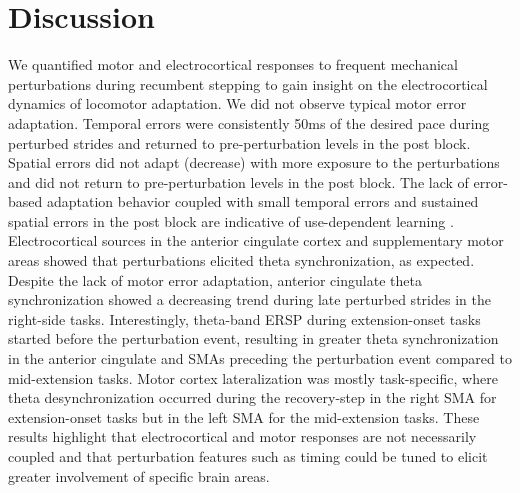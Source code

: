 \documentclass[../thesis_seyed.tex]{subfiles}
\begin{document}
\section{Discussion}
\label{sec:Discussion}

We quantified motor and electrocortical responses to frequent mechanical perturbations during recumbent stepping to gain insight on the electrocortical dynamics of locomotor adaptation. We did not observe typical motor error adaptation. Temporal errors {were consistently} \td50ms of the desired pace during perturbed strides and returned to pre-perturbation levels in the post block. Spatial errors did not adapt (decrease) with more exposure to the perturbations and did not return to pre-perturbation levels in the post block. The lack of error-based adaptation behavior coupled with small temporal errors and sustained spatial errors in the post block are indicative of use-dependent learning \cite{Diedrichsen2010-as}. Electrocortical sources in the anterior cingulate cortex and supplementary motor areas showed that perturbations elicited theta synchronization, as expected. {Despite the lack of motor error adaptation, anterior cingulate theta synchronization showed a decreasing trend during late perturbed strides in the right-side tasks.} Interestingly, theta-band ERSP during extension-onset tasks started before the perturbation event, resulting in greater theta synchronization in the anterior cingulate and SMAs preceding the perturbation event compared to mid-extension tasks. Motor cortex lateralization was mostly task-specific, where theta desynchronization occurred during the recovery-step in the right SMA for extension-onset tasks but in the left SMA for the mid-extension tasks. These results highlight that electrocortical and motor responses are not necessarily coupled and that perturbation features such as timing could be tuned to elicit greater involvement of specific brain areas.
\end{document}
